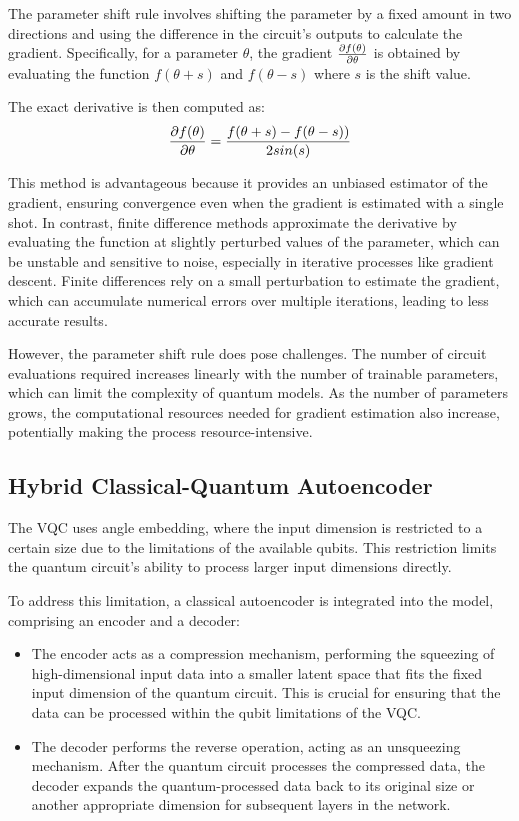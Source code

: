 The parameter shift rule involves shifting the parameter by a fixed
amount in two directions and using the difference in the circuit's
outputs to calculate the gradient. Specifically, for a parameter
\(\theta\), the gradient  \(\pdv{f(\theta)}{\theta}\) is obtained by
evaluating the function \(f(\theta+s)\) and \(f(\theta-s)\) where
\(s\) is the shift value.

The exact derivative is then computed as:
\begin{equation}
\pdv{f(\theta)}{\theta}=\frac{f(\theta+s)-f(\theta-s))}{2sin(s)}
\end{equation}

This method is advantageous because it provides an unbiased estimator
of the gradient, ensuring convergence even when the gradient is
estimated with a single shot. In contrast, finite difference methods
approximate the derivative by evaluating the function at slightly
perturbed values of the parameter, which can be unstable and
sensitive to noise, especially in iterative processes like gradient
descent. Finite differences rely on a small perturbation to estimate
the gradient, which can accumulate numerical errors over multiple
iterations, leading to less accurate results.

However, the parameter shift rule does pose challenges. The number of
circuit evaluations required increases linearly with the number of
trainable parameters, which can limit the complexity of quantum
models. As the number of parameters grows, the computational
resources needed for gradient estimation also increase, potentially
making the process resource-intensive.

\subsection{Hybrid Classical-Quantum Autoencoder}
\label{subsec:hybrid_classical_quantum_autoencoder}
The \acrlong{VQC} uses angle embedding, where the input dimension is
restricted to a certain size due to the limitations of the available
qubits. This restriction limits the quantum circuit’s ability to
process larger input dimensions directly.

To address this limitation, a classical autoencoder is integrated into the
model, comprising an encoder and a decoder:

\begin{itemize}
\item The encoder acts as a compression mechanism, performing the
  squeezing of high-dimensional input data into a smaller latent
  space that fits the fixed input dimension of the quantum circuit.
  This is crucial for ensuring that the data can be processed within
  the qubit limitations of the \gls{VQC}.

\item The decoder performs the reverse operation, acting as an
  unsqueezing mechanism. After the quantum circuit processes the
  compressed data, the decoder expands the quantum-processed data
  back to its original size or another appropriate dimension for
  subsequent layers in the network.
\end{itemize}

